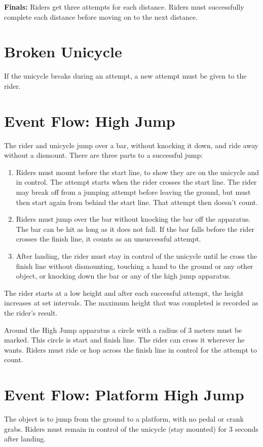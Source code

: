 \textbf{Finals:}
Riders get three attempts for each distance.
Riders must successfully complete each distance before moving on to the next distance.

\section{Broken Unicycle}
If the unicycle breaks during an attempt, a new attempt must be given to the rider.

\section{Event Flow: High Jump}
The rider and unicycle jump over a bar, without knocking it down, and ride away without a dismount.
There are three parts to a successful jump:
\begin{enumerate}
\item Riders must mount before the start line, to show they are on the unicycle and in control.
The attempt starts when the rider crosses the start line.
The rider may break off from a jumping attempt before leaving the ground, but must then start again from behind the start line.
That attempt then doesn't count.
\item Riders must jump over the bar without knocking the bar off the apparatus.
The bar can be hit as long as it does not fall.
If the bar falls before the rider crosses the finish line, it counts as an unsuccessful attempt.
\item After landing, the rider must stay in control of the unicycle until he cross the finish line without dismounting, touching a hand to the ground or any other object, or knocking down the bar or any of the high jump apparatus.
\end{enumerate}
The rider starts at a low height and after each successful attempt, the height increases at set intervals.
The maximum height that was completed is recorded as the rider's result.

Around the High Jump apparatus a circle with a radius of 3 meters must be marked.
This circle is start and finish line.
The rider can cross it wherever he wants.
Riders must ride or hop across the finish line in control for the attempt to count.

\section{Event Flow: Platform High Jump}
The object is to jump from the ground to a platform, with no pedal or crank grabs.
Riders must remain in control of the unicycle (stay mounted) for 3 seconds after landing.

